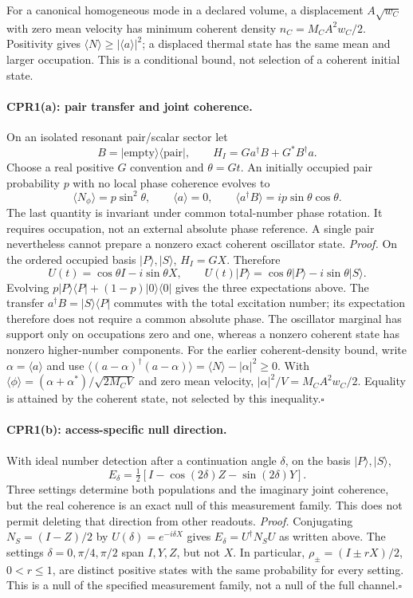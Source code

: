 \documentclass[11pt]{article}
\begin{document}
For a canonical homogeneous mode in a declared volume, a displacement
$A\sqrt{w_C}$ with zero mean velocity has minimum coherent density
$n_C=M_CA^2w_C/2$. Positivity gives
$\langle N\rangle\geq|\langle a\rangle|^2$; a displaced thermal state
has the same mean and larger occupation. This is a conditional bound,
not selection of a coherent initial state.

\paragraph{CPR1(a): pair transfer and joint coherence.}
On an isolated resonant pair/scalar sector let
\[
 B=|\mathrm{empty}\rangle\langle\mathrm{pair}|,\qquad
 H_I=G a^\dagger B+G^*B^\dagger a.
\]
Choose a real positive $G$ convention
and $\theta=Gt$. An initially occupied pair probability $p$ with no
local phase coherence evolves to
\[
 \langle N_\phi\rangle=p\sin^2\theta,\qquad
 \langle a\rangle=0,\qquad
 \langle a^\dagger B\rangle=ip\sin\theta\cos\theta.
\]
The last quantity is invariant under common total-number phase rotation.
It requires occupation, not an external absolute phase reference.
A single pair nevertheless cannot prepare a nonzero exact coherent
oscillator state.
\emph{Proof.} On the ordered occupied basis $|P\rangle,|S\rangle$,
$H_I=GX$. Therefore
\[
 U(t)=\cos\theta I-i\sin\theta X,\qquad
 U(t)|P\rangle=\cos\theta|P\rangle-i\sin\theta|S\rangle.
\]
Evolving $p|P\rangle\langle P|+(1-p)|0\rangle\langle0|$ gives the three
expectations above. The transfer $a^\dagger B=|S\rangle\langle P|$
commutes with the total excitation number; its expectation therefore does
not require a common absolute phase. The oscillator marginal has support
only on occupations zero and one, whereas a nonzero coherent state has
nonzero higher-number components. For the earlier coherent-density bound,
write $\alpha=\langle a\rangle$ and use
$\langle(a-\alpha)^\dagger(a-\alpha)\rangle
=\langle N\rangle-|\alpha|^2\geq0$.
With $\langle\phi\rangle=(\alpha+\alpha^*)/\sqrt{2M_C V}$ and zero
mean velocity, $|\alpha|^2/V=M_CA^2w_C/2$. Equality is attained by the
coherent state, not selected by this inequality.\hfill$\square$

\paragraph{CPR1(b): access-specific null direction.}
With ideal number detection after a continuation angle
$\delta$, on the basis $|P\rangle,|S\rangle$,
\[
 E_\delta=\tfrac12[I-\cos(2\delta)Z-\sin(2\delta)Y].
\]
Three settings determine both populations and the imaginary joint
coherence, but the real coherence is an exact null of this measurement
family. This does not permit deleting that direction from other readouts.
\emph{Proof.} Conjugating $N_S=(I-Z)/2$ by $U(\delta)=e^{-i\delta X}$
gives $E_\delta=U^\dagger N_SU$ as written above. The settings
$\delta=0,\pi/4,\pi/2$ span $I,Y,Z$, but not $X$. In particular,
$\rho_\pm=(I\pm rX)/2$, $0<r\leq1$, are distinct positive states
with the same probability for every setting. This is a null of the
specified measurement family, not a null of the full channel.\hfill$\square$
\end{document}
